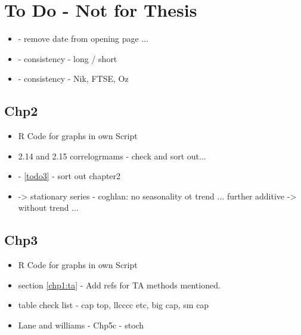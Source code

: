 
\chapter{To Do - Not for Thesis} %

\label{Chapter7} %




\begin{itemize}
\item - remove date from opening page ...
\item - consistency - long / short
\item - consistency - Nik, FTSE, Oz

\end{itemize}

\section{Chp2}
\begin{itemize}
\item R Code for graphs in own Script
\item 2.14 and 2.15 correlogrmams - check and sort out...
\item - \ref{todo3} - sort out chapter2
\item -> stationary series - coghlan: no seasonality ot trend ...  further additive -> without trend ...
\end{itemize}

\section{Chp3}
\begin{itemize}
\item R Code for graphs in own Script
\item section \ref{chp1:ta} - Add refs for TA methods mentioned.
\item table check list - cap top, llcccc etc, big cap, sm cap
\item Lane \cite{lane1986using} and williams \cite{williams2011long} \cite{williams1989definitive} - Chp5c - stoch
\end{itemize}

